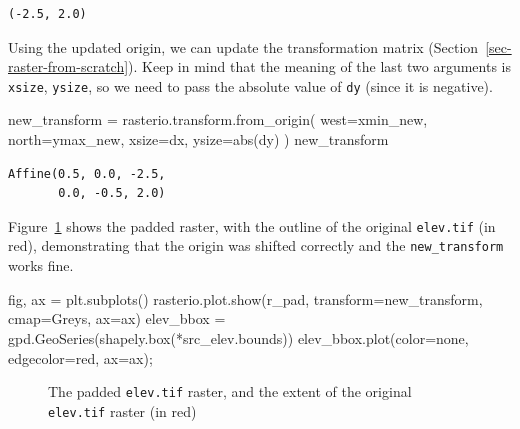 \documentclass[
  letterpaper,
]{krantz}
\newenvironment{Shaded}{\begin{snugshade}}{\end{snugshade}}
\newcommand{\BuiltInTok}[1]{\textcolor[rgb]{0.00,0.23,0.31}{#1}}
\newcommand{\NormalTok}[1]{\textcolor[rgb]{0.00,0.23,0.31}{#1}}
\newcommand{\OperatorTok}[1]{\textcolor[rgb]{0.37,0.37,0.37}{#1}}
\newcommand{\StringTok}[1]{\textcolor[rgb]{0.13,0.47,0.30}{#1}}
\begin{document}
\begin{verbatim}
(-2.5, 2.0)
\end{verbatim}

Using the updated origin, we can update the transformation matrix
(Section~\ref{sec-raster-from-scratch}). Keep in mind that the meaning
of the last two arguments is \texttt{xsize}, \texttt{ysize}, so we need
to pass the absolute value of \texttt{dy} (since it is negative).

\begin{Shaded}
\begin{Highlighting}[]
\NormalTok{new\_transform }\OperatorTok{=}\NormalTok{ rasterio.transform.from\_origin(}
\NormalTok{    west}\OperatorTok{=}\NormalTok{xmin\_new, }
\NormalTok{    north}\OperatorTok{=}\NormalTok{ymax\_new, }
\NormalTok{    xsize}\OperatorTok{=}\NormalTok{dx, }
\NormalTok{    ysize}\OperatorTok{=}\BuiltInTok{abs}\NormalTok{(dy)}
\NormalTok{)}
\NormalTok{new\_transform}
\end{Highlighting}
\end{Shaded}

\begin{verbatim}
Affine(0.5, 0.0, -2.5,
       0.0, -0.5, 2.0)
\end{verbatim}

Figure~\ref{fig-raster-shift-origin} shows the padded raster, with the
outline of the original \texttt{elev.tif} (in red), demonstrating that
the origin was shifted correctly and the \texttt{new\_transform} works
fine.

\begin{Shaded}
\begin{Highlighting}[]
\NormalTok{fig, ax }\OperatorTok{=}\NormalTok{ plt.subplots()}
\NormalTok{rasterio.plot.show(r\_pad, transform}\OperatorTok{=}\NormalTok{new\_transform, cmap}\OperatorTok{=}\StringTok{\textquotesingle{}Greys\textquotesingle{}}\NormalTok{, ax}\OperatorTok{=}\NormalTok{ax)}
\NormalTok{elev\_bbox }\OperatorTok{=}\NormalTok{ gpd.GeoSeries(shapely.box(}\OperatorTok{*}\NormalTok{src\_elev.bounds))}
\NormalTok{elev\_bbox.plot(color}\OperatorTok{=}\StringTok{\textquotesingle{}none\textquotesingle{}}\NormalTok{, edgecolor}\OperatorTok{=}\StringTok{\textquotesingle{}red\textquotesingle{}}\NormalTok{, ax}\OperatorTok{=}\NormalTok{ax)}\OperatorTok{;}
\end{Highlighting}
\end{Shaded}

\begin{figure}[H]


\caption{\label{fig-raster-shift-origin}The padded \texttt{elev.tif}
raster, and the extent of the original \texttt{elev.tif} raster (in
red)}

\end{figure}%
\end{document}
